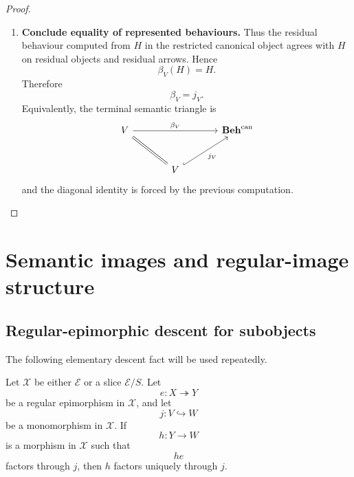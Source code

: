 \begin{proof}
\begin{enumerate}
        \item \textbf{Conclude equality of represented behaviours.}
        Thus the residual behaviour computed from \(H\) in the restricted
        canonical object agrees with \(H\) on residual objects and residual
        arrows. Hence
        \[
            \beta_V(H)=H.
        \]
        Therefore
        \[
            \beta_V=j_V.
        \]
        Equivalently, the terminal semantic triangle is
        \[
        \begin{tikzcd}[column sep=large, row sep=large]
            V
                \arrow[rr, "\beta_V"]
                \arrow[dr, equal]
            &&
            \mathbf{Beh}^{\mathrm{can}}
            \\
            &
            V
                \arrow[ur, hook, "j_V"']
            &
        \end{tikzcd}
        \]
        and the diagonal identity is forced by the previous computation.
    \end{enumerate}
\end{proof}

\section{Semantic images and regular-image structure}
\label{sec:regular-semantic-images}

\subsection{Regular-epimorphic descent for subobjects}
\label{subsec:regular-epi-descent-subobjects}

The following elementary descent fact will be used repeatedly.

\begin{lemma}
\label{lem:regular-epi-descent-for-subobjects-membership}
    Let \(\mathcal X\) be either \(\mathcal E\) or a slice
    \(\mathcal E/S\). Let
    \[
        e:X\twoheadrightarrow Y
    \]
    be a regular epimorphism in \(\mathcal X\), and let
    \[
        j:V\hookrightarrow W
    \]
    be a monomorphism in \(\mathcal X\). If
    \[
        h:Y\to W
    \]
    is a morphism in \(\mathcal X\) such that
    \[
        he
    \]
    factors through \(j\), then \(h\) factors uniquely through \(j\).
\end{lemma}

